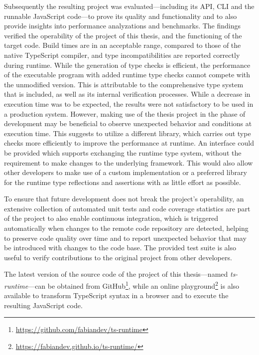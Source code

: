 Subsequently the resulting project was evaluated---including its API, CLI and the runnable JavaScript code---to prove its quality and functionality and to also provide insights into performance analyzations and benchmarks. The findings verified the operability of the project of this thesis, and the functioning of the target code. Build times are in an acceptable range, compared to those of the native TypeScript compiler, and type incompatibilities are reported correctly during runtime. While the generation of type checks is efficient, the performance of the executable program with added runtime type checks cannot compete with the unmodified version. This is attributable to the comprehensive type system that is included, as well as its internal verification processes. While a decrease in execution time was to be expected, the results were not satisfactory to be used in a production system. However, making use of the thesis project in the phase of development may be beneficial to observe unexpected behavior and conditions at execution time. This suggests to utilize a different library, which carries out type checks more efficiently to improve the performance at runtime. An interface could be provided which supports exchanging the runtime type system, without the requirement to make changes to the underlying framework. This would also allow other developers to make use of a custom implementation or a preferred library for the runtime type reflections and assertions with as little effort as possible.

To ensure that future development does not break the project's operability, an extensive collection of automated unit tests and code coverage statistics are part of the project to also enable continuous integration, which is triggered automatically when changes to the remote code repository are detected, helping to preserve code quality over time and to report unexpected behavior that may be introduced with changes to the code base. The provided test suite is also useful to verify contributions to the original project from other developers.

The latest version of the source code of the project of this thesis---named \emph{ts-runtime}---can be obtained from GitHub\footnote{\url{https://github.com/fabiandev/ts-runtime}}, while an online playground\footnote{\url{https://fabiandev.github.io/ts-runtime/}} is also available to transform TypeScript syntax in a browser and to execute the resulting JavaScript code.
